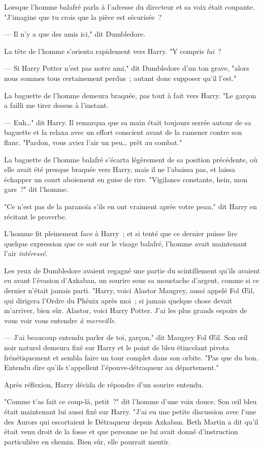 Lorsque l'homme balafré parla à l'adresse du directeur et sa voix était coupante. "J'imagine que tu crois que la pièce est sécurisée~?

--- Il n'y a que des amis ici," dit Dumbledore.

La tête de l'homme s'orienta rapidement vers Harry. "Y compris \emph{lui}~?

--- Si Harry Potter n'est pas notre ami," dit Dumbledore d'un ton grave, "alors nous sommes tous certainement perdus~; autant donc supposer qu'il l'est."

La baguette de l'homme demeura braquée, pas tout à fait vers Harry. "Le garçon a failli me tirer dessus à l'instant.

--- Euh…" dit Harry. Il remarqua que sa main était toujours serrée autour de sa baguette et la relaxa avec un effort conscient avant de la ramener contre son flanc. "Pardon, vous aviez l'air un peu… prêt au combat."

La baguette de l'homme balafré s'écarta légèrement de sa position précédente, où elle avait été presque braquée vers Harry, mais il ne l'abaissa pas, et laissa échapper un court aboiement en guise de rire. "Vigilance constante, hein, mon gars~?" dit l'homme.

"Ce n'est pas de la paranoïa s'ils en ont vraiment après votre peau," dit Harry en récitant le proverbe.

L'homme fit pleinement face à Harry~; et si tenté que ce dernier puisse lire quelque expression que ce soit sur le visage balafré, l'homme avait maintenant l'air \emph{intéressé}.

Les yeux de Dumbledore avaient regagné une partie du scintillement qu'ils avaient eu avant l'évasion d'Azkaban, un sourire sous sa moustache d'argent, comme si ce dernier n'était jamais parti. "Harry, voici Alastor Maugrey, aussi appelé Fol Œil, qui dirigera l'Ordre du Phénix après moi~; si jamais quelque chose devait m'arriver, bien sûr. Alastor, voici Harry Potter. J'ai les plus grands espoirs de vous voir vous entendre \emph{à merveille}.

--- J'ai beaucoup entendu parler de toi, garçon," dit Maugrey Fol Œil. Son œil noir naturel demeura fixé sur Harry et le point de bleu étincelant pivota frénétiquement et sembla faire un tour complet dans son orbite. "Pas que du bon. Entendu dire qu'ils t'appellent l'épouve-détraqueur au département."

Après réflexion, Harry décida de répondre d'un sourire entendu.

"Comme t'as fait ce coup-là, petit~?" dit l'homme d'une voix douce. Son œil bleu était maintenant lui aussi fixé sur Harry. "J'ai eu une petite discussion avec l'une des Aurors qui escortaient le Détraqueur depuis Azkaban. Beth Martin a dit qu'il était venu droit de la fosse et que personne ne lui avait donné d'instruction particulière en chemin. Bien sûr, elle pourrait mentir.

